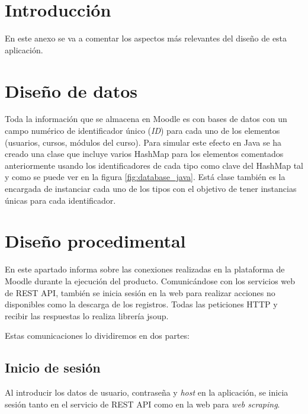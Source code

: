 
\section{Introducción}

En este anexo se va a comentar los aspectos más relevantes del diseño de esta aplicación.

\section{Diseño de datos}

Toda la información que se almacena en Moodle es con bases de datos con un campo numérico de identificador único (\textit{ID}) para cada uno de los elementos (usuarios, cursos, módulos del curso). Para simular este efecto en Java se ha creado una clase que incluye varios HashMap para los elementos comentados anteriormente usando los identificadores de cada tipo como clave del HashMap tal y como se puede ver en la figura \ref{fig:database_java}. Está clase también es la encargada de instanciar cada uno de los tipos con el objetivo de tener instancias únicas para cada identificador.



\section{Diseño procedimental}

En este apartado informa sobre las conexiones realizadas en la plataforma de Moodle durante la ejecución del producto. Comunicándose con los servicios web de REST API, también se inicia sesión en la web para realizar acciones no disponibles como la descarga de los registros. Todas las peticiones HTTP y recibir las respuestas lo realiza librería jsoup.

Estas comunicaciones lo dividiremos en dos partes:

\subsection{Inicio de sesión}

Al introducir los datos de usuario, contraseña y \textit{host} en la aplicación, se inicia sesión tanto en el servicio de REST API como en la web para \textit{web scraping}.

